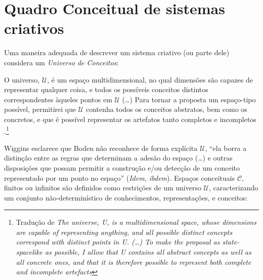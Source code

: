 {\section{Quadro Conceitual de sistemas criativos}\label{sec:csf}

Uma maneira adequada de descrever um sistema criativo (ou parte dele) considera um \emph{Universo de Conceitos}:

\begin{citacao}
O universo, $\mathcal{U}$, é um espaço multidimensional, no qual dimensões são capazes de representar qualquer coisa, e todos os possíveis conceitos distintos correspondentes àqueles pontos em $\mathcal{U}$ (\ldots) Para tornar a proposta um espaço-tipo possível, permitirei que $\mathcal{U}$ contenha todos os conceitos abstratos, bem como os concretos, e que é possível representar os artefatos tanto completos e incompletos \cite[p.~451]{wiggins_framework_2006}.\footnote{Tradução de \emph{The universe, U, is a multidimensional space, whose dimensions are capable of representing anything, and all possible distinct concepts correspond with distinct points in U. (\ldots) To make the proposal as state-spacelike as possible, I allow that U contains all abstract concepts as well as all concrete ones, and that it is therefore possible to represent both complete and incomplete artefacts}}
\end{citacao}

Wiggins esclarece que Boden não reconhece de forma explícita $\mathcal{U}$, ``ela borra a distinção entre as regras que determinam a adesão do espaço (\ldots) e outras disposições que possam permitir a construção e/ou detecção de um conceito representado por um ponto no espaço'' (\emph{Idem, ibdem}). Espaços conceituais $\mathcal{C}$, finitos ou infinitos são definidos como restrições de um universo $\mathcal{U}$, caracterizando um conjunto não-determinístico de conhecimentos, representações, e conceitos:

\begin{citacao}
\end{citacao}

}
